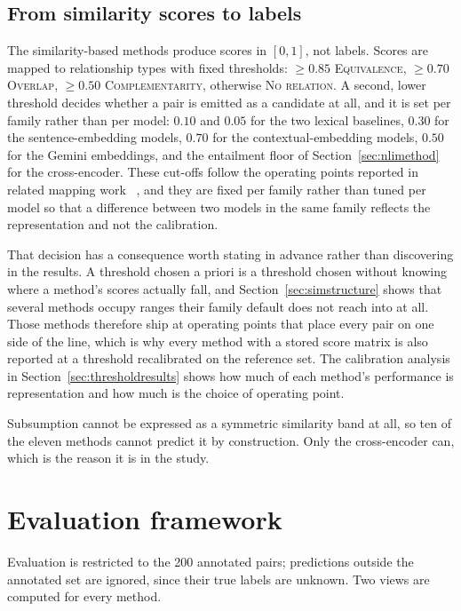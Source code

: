 \subsection{From similarity scores to labels}\label{sec:thresholds}

The similarity-based methods produce scores in $[0,1]$, not labels. Scores are
mapped to relationship types with fixed thresholds: $\geq 0.85$
\textsc{Equivalence}, $\geq 0.70$ \textsc{Overlap}, $\geq 0.50$
\textsc{Complementarity}, otherwise \textsc{No relation}. A second, lower
threshold decides whether a pair is emitted as a candidate at all, and it is
set per family rather than per model: $0.10$ and $0.05$ for the two lexical
baselines, $0.30$ for the sentence-embedding models, $0.70$ for the
contextual-embedding models, $0.50$ for the Gemini embeddings, and the
entailment floor of Section~\ref{sec:nlimethod} for the cross-encoder. These
cut-offs follow the operating points reported in related mapping work
~\cite{sapkota2016regcmantic}, and they are fixed per family rather than tuned
per model so that a difference between two models in the same family reflects
the representation and not the calibration.

That decision has a consequence worth stating in advance rather than
discovering in the results. A threshold chosen a priori is a threshold chosen
without knowing where a method's scores actually fall, and
Section~\ref{sec:simstructure} shows that several methods occupy ranges their
family default does not reach into at all. Those methods therefore ship at
operating points that place every pair on one side of the line, which is why
every method with a stored score matrix is also reported at a threshold
recalibrated on the reference set. The calibration analysis in
Section~\ref{sec:thresholdresults} shows how much of each method's performance
is representation and how much is the choice of operating point.

Subsumption cannot be expressed as a symmetric similarity band at all, so ten
of the eleven methods cannot predict it by construction. Only the cross-encoder
can, which is the reason it is in the study.

\section{Evaluation framework}\label{sec:evaluation}

Evaluation is restricted to the 200 annotated pairs; predictions outside the
annotated set are ignored, since their true labels are unknown. Two views are
computed for every method.

